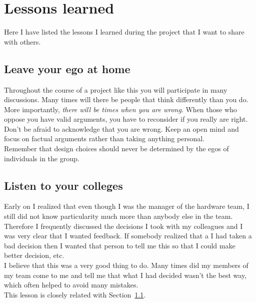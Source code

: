 
\section{Lessons learned}\label{sec:lessons}
Here I have listed the lessons I learned during the project that I want to share with others.

\subsection{Leave your ego at home}\label{sec:ego}
Throughout the course of a project like this you will participate in many discussions. Many times will there be people that think differently than you do. More importantly, \emph{there will be times when you are wrong}. When those who oppose you have valid arguments, you have to reconsider if you really are right. \\
Don't be afraid to acknowledge that you are wrong. Keep an open mind and focus on factual arguments rather than taking anything personal. \\
Remember that design choices should never be determined by the egos of individuals in the group.


\subsection{Listen to your colleges}\label{sec:listen}
Early on I realized that even though I was the manager of the hardware team, I still did not know particularity much more than anybody else in the team. Therefore I frequently discussed the decisions I took with my colleagues and I was very clear that I wanted feedback. If somebody realized that a I had taken a bad decision then I wanted that person to tell me this so that I could make better decision, etc. \\
I believe that this was a very good thing to do. Many times did my members of my team come to me and tell me that what I had decided wasn't the best way, which often helped to avoid many mistakes. \\
This lesson is closely related with Section~\ref{sec:ego}.


